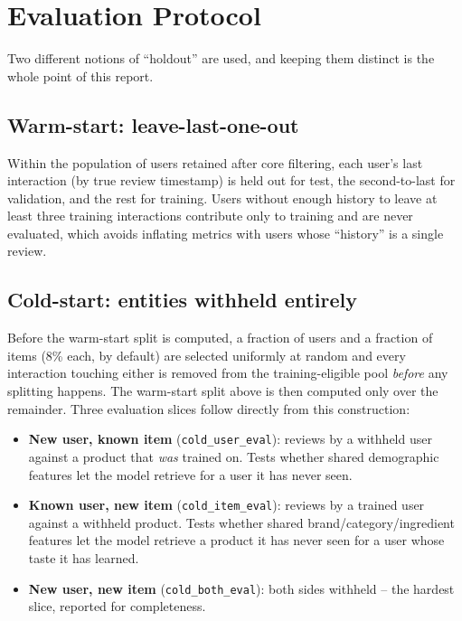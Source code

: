 \section{Evaluation Protocol}
\label{sec:evaluation}

Two different notions of ``holdout'' are used, and keeping them distinct is
the whole point of this report.

\subsection{Warm-start: leave-last-one-out}

Within the population of users retained after core filtering, each user's
last interaction (by true review timestamp) is held out for test, the
second-to-last for validation, and the rest for training. Users without
enough history to leave at least three training interactions contribute
only to training and are never evaluated, which avoids inflating metrics
with users whose ``history'' is a single review.

\subsection{Cold-start: entities withheld entirely}

Before the warm-start split is computed, a fraction of users and a fraction
of items (8\% each, by default) are selected uniformly at random and every
interaction touching either is removed from the training-eligible pool
\emph{before} any splitting happens. The warm-start split above is then
computed only over the remainder. Three evaluation slices follow directly
from this construction:

\begin{itemize}
  \item \textbf{New user, known item} (\texttt{cold\_user\_eval}): reviews
        by a withheld user against a product that \emph{was} trained on.
        Tests whether shared demographic features let the model retrieve
        for a user it has never seen.
  \item \textbf{Known user, new item} (\texttt{cold\_item\_eval}): reviews
        by a trained user against a withheld product. Tests whether shared
        brand/category/ingredient features let the model retrieve a product
        it has never seen for a user whose taste it has learned.
  \item \textbf{New user, new item} (\texttt{cold\_both\_eval}): both sides
        withheld -- the hardest slice, reported for completeness.
\end{itemize}


